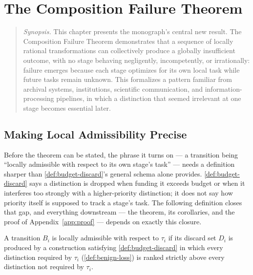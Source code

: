 \chapter{The Composition Failure Theorem}
\label{ch:composition-failure}

\begin{quotation}
\noindent\textit{Synopsis.} This chapter presents the monograph's central
new result. The Composition Failure Theorem demonstrates that a sequence of
locally rational transformations can collectively produce a globally
insufficient outcome, with no stage behaving negligently, incompetently, or
irrationally: failure emerges because each stage optimizes for its own
local task while future tasks remain unknown. This formalizes a pattern
familiar from archival systems, institutions, scientific communication, and
information-processing pipelines, in which a distinction that seemed
irrelevant at one stage becomes essential later.
\end{quotation}

\newresult

\section{Making Local Admissibility Precise}

Before the theorem can be stated, the phrase it turns on --- a transition
being ``locally admissible with respect to its own stage's task''
--- needs a definition sharper than \cref{def:budget-discard}'s general
schema alone provides. \cref{def:budget-discard} says a distinction is
dropped when funding it exceeds budget or when it interferes too
strongly with a higher-priority distinction; it does not say how
priority itself is supposed to track a stage's task. The following
definition closes that gap, and everything downstream --- the theorem,
its corollaries, and the proof of Appendix~\ref{app:proof} --- depends on
exactly this closure.

\begin{definition}
\label{def:locally-admissible}
A transition $B_i$ is locally admissible with respect to $\tau_i$ if its
discard set $D_i$ is produced by a construction satisfying
\cref{def:budget-discard} in which every distinction required by $\tau_i$
(\cref{def:benign-loss}) is ranked strictly above every distinction not
required by $\tau_i$.
\end{definition}

